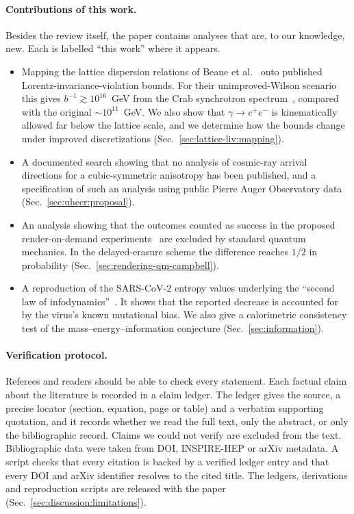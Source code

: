 \paragraph{Contributions of this work.} Besides the review itself, the paper contains analyses that are, to our knowledge, new. Each is labelled ``this work'' where it appears.
\begin{itemize}
\item Mapping the lattice dispersion relations of Beane et al.~\cite{Beane2014constraints} onto published Lorentz-invariance-violation bounds. For their unimproved-Wilson scenario this gives $b^{-1}\gtrsim10^{16}$~GeV from the Crab synchrotron spectrum~\cite{Liberati2012scale}, compared with the original $\sim10^{11}$~GeV. We also show that $\gamma\to e^+e^-$ is kinematically allowed far below the lattice scale, and we determine how the bounds change under improved discretizations (Sec.~\ref{sec:lattice-liv:mapping}).
\item A documented search showing that no analysis of cosmic-ray arrival directions for a cubic-symmetric anisotropy has been published, and a specification of such an analysis using public Pierre Auger Observatory data (Sec.~\ref{sec:uhecr:proposal}).
\item An analysis showing that the outcomes counted as success in the proposed render-on-demand experiments~\cite{Campbell2017on} are excluded by standard quantum mechanics. In the delayed-erasure scheme the difference reaches $1/2$ in probability (Sec.~\ref{sec:rendering-qm-campbell}).
\item A reproduction of the SARS-CoV-2 entropy values underlying the ``second law of infodynamics''~\cite{Vopson2022second}. It shows that the reported decrease is accounted for by the virus's known mutational bias. We also give a calorimetric consistency test of the mass--energy--information conjecture (Sec.~\ref{sec:information}).
\end{itemize}

\paragraph{Verification protocol.} Referees and readers should be able to check every statement. Each factual claim about the literature is recorded in a claim ledger. The ledger gives the source, a precise locator (section, equation, page or table) and a verbatim supporting quotation, and it records whether we read the full text, only the abstract, or only the bibliographic record. Claims we could not verify are excluded from the text. Bibliographic data were taken from DOI, INSPIRE-HEP or arXiv metadata. A script checks that every citation is backed by a verified ledger entry and that every DOI and arXiv identifier resolves to the cited title. The ledgers, derivations and reproduction scripts are released with the paper (Sec.~\ref{sec:discussion:limitations}).

